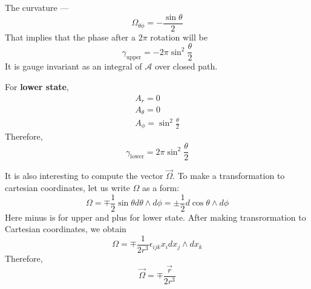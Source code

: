 \documentclass{article}
\begin{document}
The curvature --- 
\begin{equation}
    \Omega_{\theta \phi} = -\frac{\sin{\theta}}{2}
\end{equation}
That implies that the phase after a $2\pi$ rotation will be
\begin{equation}
    \gamma_\mathrm{upper} = -2\pi\sin^2{\frac{\theta}{2}}
\end{equation}
It is gauge invariant as an integral of $\mathcal{A}$ over closed path.

For {\bf lower state}, 
\begin{equation}
    \begin{gathered}
        A_r = 0\\
        A_\theta = 0\\
        A_\phi = \sin^2{\frac{\theta}{2}}
    \end{gathered}
\end{equation}
Therefore,
\begin{equation}
    \gamma_\mathrm{lower} = 2\pi\sin^2{\frac{\theta}{2}}
\end{equation}

It is also interesting to compute the vector $\vec{\Omega}$. To make a transformation to 
cartesian coordinates, let us write $\Omega$ as a form:
\begin{equation}
    \Omega = \mp \frac{1}{2} \sin{\theta} d\theta\wedge d\phi = 
            \pm\frac{1}{2} d\cos{\theta}\wedge d\phi
\end{equation}
Here minus is for upper and plus for lower state.
After making transrormation to Cartesian coordinates, we obtain
\begin{equation}
    \Omega = \mp\frac{1}{2r^3} \epsilon_{ijk}x_i dx_j\wedge dx_k
\end{equation}
Therefore,
\begin{equation}
    \vec{\Omega} = \mp \frac{\vec{r}}{2r^3}
\end{equation}
\end{document}
